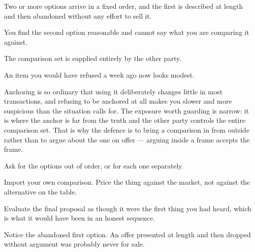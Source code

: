 \begin{feedback}
  \item Two or more options arrive in a fixed order, and the first is described at length and then abandoned without any effort to sell it.
  \item You find the second option reasonable and cannot say what you are comparing it against.
  \item The comparison set is supplied entirely by the other party.
  \item An item you would have refused a week ago now looks modest.
\end{feedback}

\begin{failure}
Anchoring is so ordinary that using it deliberately changes little in most transactions, and refusing to be anchored at all makes you slower and more suspicious than the situation calls for. The exposure worth guarding is narrow: it is where the anchor is far from the truth and the other party controls the entire comparison set. That is why the defence is to bring a comparison in from outside rather than to argue about the one on offer --- arguing inside a frame accepts the frame.
\end{failure}

\begin{countermeasures}
  \item Ask for the options out of order, or for each one separately.
  \item Import your own comparison. Price the thing against the market, not against the alternative on the table.
  \item Evaluate the final proposal as though it were the first thing you had heard, which is what it would have been in an honest sequence.
  \item Notice the abandoned first option. An offer presented at length and then dropped without argument was probably never for sale.
\end{countermeasures}

\seesources
{}
